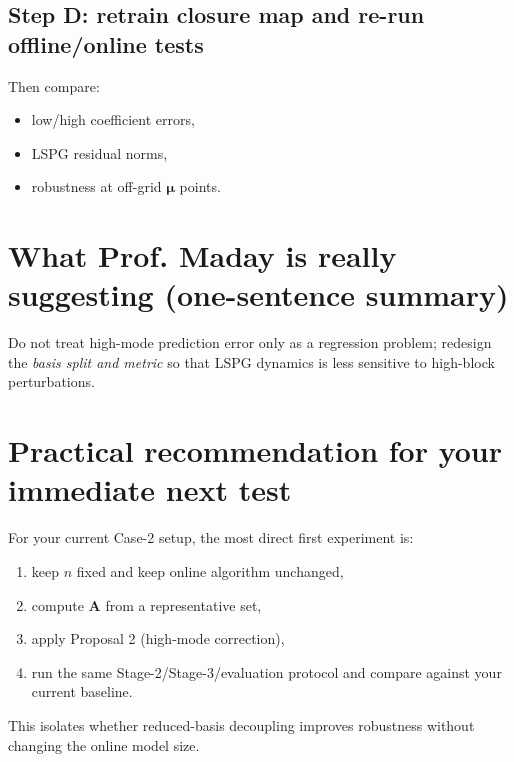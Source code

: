\documentclass[11pt]{article}
\begin{document}
\subsection*{Step D: retrain closure map and re-run offline/online tests}
Then compare:
\begin{itemize}[leftmargin=1.5em]
\item low/high coefficient errors,
\item LSPG residual norms,
\item robustness at off-grid $\bm\mu$ points.
\end{itemize}

\section{What Prof. Maday is really suggesting (one-sentence summary)}
Do not treat high-mode prediction error only as a regression problem; redesign the \emph{basis split and metric} so that LSPG dynamics is less sensitive to high-block perturbations.

\section{Practical recommendation for your immediate next test}
For your current Case-2 setup, the most direct first experiment is:
\begin{enumerate}[leftmargin=1.5em]
\item keep $n$ fixed and keep online algorithm unchanged,
\item compute $\mathbf A$ from a representative set,
\item apply Proposal 2 (high-mode correction),
\item run the same Stage-2/Stage-3/evaluation protocol and compare against your current baseline.
\end{enumerate}
This isolates whether reduced-basis decoupling improves robustness without changing the online model size.
\end{document}
